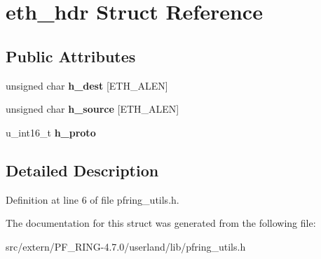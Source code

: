 \hypertarget{structeth__hdr}{
\section{eth\_\-hdr Struct Reference}
\label{structeth__hdr}
}
\subsection*{Public Attributes}
\begin{DoxyCompactItemize}
\item 
\hypertarget{structeth__hdr_adbdada886f6897eaadb28f2923a65308}{
unsigned char {\bfseries h\_\-dest} \mbox{[}ETH\_\-ALEN\mbox{]}}
\label{structeth__hdr_adbdada886f6897eaadb28f2923a65308}

\item 
\hypertarget{structeth__hdr_a33e335d733583e4b7d36d7cfb35d4e2a}{
unsigned char {\bfseries h\_\-source} \mbox{[}ETH\_\-ALEN\mbox{]}}
\label{structeth__hdr_a33e335d733583e4b7d36d7cfb35d4e2a}

\item 
\hypertarget{structeth__hdr_acbe0c8ef6d4d88f2baef2e3b87abe375}{
u\_\-int16\_\-t {\bfseries h\_\-proto}}
\label{structeth__hdr_acbe0c8ef6d4d88f2baef2e3b87abe375}

\end{DoxyCompactItemize}


\subsection{Detailed Description}


Definition at line 6 of file pfring\_\-utils.h.



The documentation for this struct was generated from the following file:\begin{DoxyCompactItemize}
\item 
src/extern/PF\_\-RING-\/4.7.0/userland/lib/pfring\_\-utils.h\end{DoxyCompactItemize}

